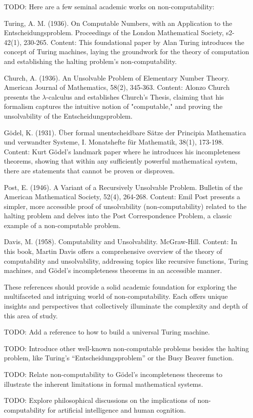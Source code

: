 {\color{red} TODO: Here are a few seminal academic works on non-computability:

Turing, A. M. (1936). On Computable Numbers, with an Application to the Entscheidungsproblem. Proceedings of the London Mathematical Society, s2-42(1), 230-265. Content: This foundational paper by Alan Turing introduces the concept of Turing machines, laying the groundwork for the theory of computation and establishing the halting problem's non-computability.

Church, A. (1936). An Unsolvable Problem of Elementary Number Theory. American Journal of Mathematics, 58(2), 345-363. Content: Alonzo Church presents the $\lambda$-calculus and establishes Church’s Thesis, claiming that his formalism captures the intuitive notion of "computable," and proving the unsolvability of the Entscheidungsproblem.

Gödel, K. (1931). Über formal unentscheidbare Sätze der Principia Mathematica und verwandter Systeme, I. Monatshefte für Mathematik, 38(1), 173-198. Content: Kurt Gödel's landmark paper where he introduces his incompleteness theorems, showing that within any sufficiently powerful mathematical system, there are statements that cannot be proven or disproven.

Post, E. (1946). A Variant of a Recursively Unsolvable Problem. Bulletin of the American Mathematical Society, 52(4), 264-268. Content: Emil Post presents a simpler, more accessible proof of unsolvability (non-computability) related to the halting problem and delves into the Post Correspondence Problem, a classic example of a non-computable problem.

Davis, M. (1958). Computability and Unsolvability. McGraw-Hill. Content: In this book, Martin Davis offers a comprehensive overview of the theory of computability and unsolvability, addressing topics like recursive functions, Turing machines, and Gödel’s incompleteness theorems in an accessible manner.

These references should provide a solid academic foundation for exploring the multifaceted and intriguing world of non-computability. Each offers unique insights and perspectives that collectively illuminate the complexity and depth of this area of study.
}

{\color{red} TODO: Add a reference to how to build a universal Turing machine.}

{\color{red} TODO: Introduce other well-known non-computable problems besides the halting problem, like Turing’s “Entscheidungsproblem” or the Busy Beaver function.}

{\color{red} TODO: Relate non-computability to Gödel's incompleteness theorems to illustrate the inherent limitations in formal mathematical systems.}

{\color{red} TODO: Explore philosophical discussions on the implications of non-computability for artificial intelligence and human cognition.}

